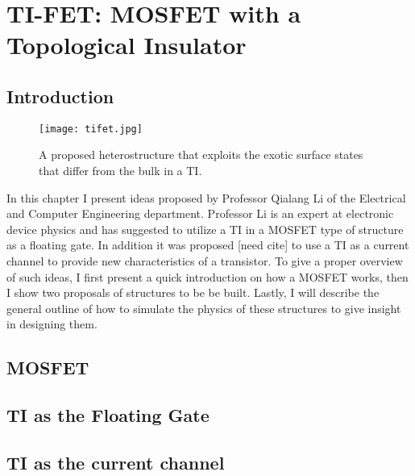 \documentclass[11pt]{report}
\begin{document}
\chapter{TI-FET: MOSFET with a Topological Insulator}
\section{Introduction}
\begin{figure}[h]
\center
\texttt{[image: tifet.jpg]}
\caption{A proposed heterostructure that exploits the exotic surface states that differ from the bulk in a TI. 
}\label{tifet}
\end{figure}
In this chapter I present ideas proposed by Professor Qialang Li of the Electrical and Computer Engineering department. Professor Li is an expert at electronic device physics and has suggested to utilize a TI in a MOSFET type of structure as a floating gate. In addition it was proposed [need cite] to use a TI as a current channel to provide new characteristics of a transistor.  To give a proper overview of such ideas, I first present a quick introduction on how a MOSFET works, then I show two proposals of structures to be be built. Lastly, I will describe the general outline of how to simulate the physics of these structures to give insight in designing them.

\section{MOSFET}

\section{TI as the Floating Gate}

\section{TI as the current channel}

\end{document}
